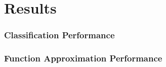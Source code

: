 \documentclass[11pt]{afthesis}
\begin{document}
	
	\chapter{Results}
	\label{ch:results}
	
	\subsection{Classification Performance}
	
	
	\subsection{Function Approximation Performance}
	
	
	\makeatletter
	\def\fixedlabel#1#2{%
		\@bsphack%
		\protected@write\@auxout{}%
		{\string\newlabel{#1}{{#2}{\thepage}}}%
		\@esphack}
	\makeatother
	
\end{document}
